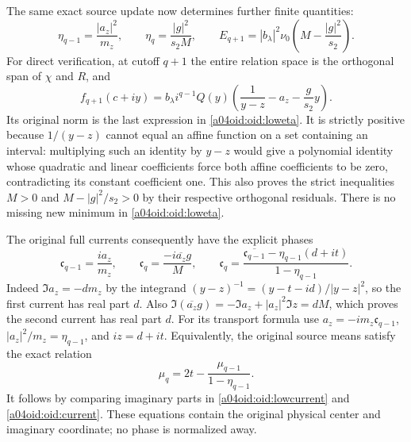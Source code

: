 \documentclass[11pt,a4paper]{article}
\begin{document}
The same exact source update now determines further finite quantities:
\begin{equation}\label{a04oid:oid:loweta}
 \boxed{\eta_{q-1}=\frac{|a_z|^2}{m_z},\qquad
 \eta_q=\frac{|g|^2}{s_2M},\qquad
 E_{q+1}=|b_\lambda|^2\nu_0
 \left(M-\frac{|g|^2}{s_2}\right).}
\end{equation}
For direct verification, at cutoff $q+1$ the entire relation space
is the orthogonal span of $\chi$ and $R$, and
\[
 f_{q+1}(c+iy)=b_\lambda i^{q-1}Q(y)
 \left(\frac1{y-z}-a_z-\frac{g}{s_2}y\right).
\]
Its original norm is the last expression in \eqref{a04oid:oid:loweta}.
It is strictly positive because $1/(y-z)$ cannot equal an affine
function on a set containing an interval: multiplying such an
identity by $y-z$ would give a polynomial identity whose quadratic
and linear coefficients force both affine coefficients to be zero,
contradicting its constant coefficient one. This also proves the
strict inequalities $M>0$ and $M-|g|^2/s_2>0$ by their respective
orthogonal residuals. There is no missing new minimum in
\eqref{a04oid:oid:loweta}.

The original full currents consequently have the explicit phases
\begin{equation}\label{a04oid:oid:lowcurrent}
 \mathfrak c_{q-1}=\frac{i a_z}{m_z},\qquad
 \mathfrak c_q=\frac{-i\overline{a_z}g}{M},\qquad
 \boxed{\mathfrak c_q=
 \frac{\overline{\mathfrak c_{q-1}}
 -\eta_{q-1}(d+it)}{1-\eta_{q-1}}.}
\end{equation}
Indeed $\Im a_z=-dm_z$ by the integrand
$(y-z)^{-1}=(y-t-id)/|y-z|^2$, so the first current has real
part $d$. Also
$\Im(\overline{a_z}g)=-\Im a_z+|a_z|^2\Im z=dM$,
which proves the second current has real part $d$.
For its transport formula use
$a_z=-im_z\mathfrak c_{q-1}$,
$|a_z|^2/m_z=\eta_{q-1}$, and $iz=d+it$.
Equivalently, the original source means satisfy the exact relation
\begin{equation}\label{a04oid:oid:lowmean}
 \mu_q=2t-\frac{\mu_{q-1}}{1-\eta_{q-1}}.
\end{equation}
It follows by comparing imaginary parts in \eqref{a04oid:oid:lowcurrent}
and \eqref{a04oid:oid:current}. These equations contain the original
physical center and imaginary coordinate; no phase is normalized away.
\end{document}
